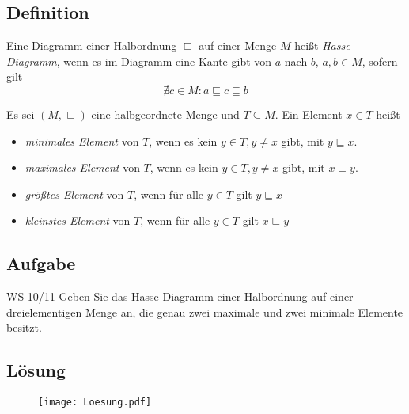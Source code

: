\subsection{Definition}
\begin{frame}
	\begin{Definition}
		Eine Diagramm einer Halbordnung $\sqsubseteq$ auf einer Menge $M$ heißt \emph{Hasse-Diagramm}, wenn es im Diagramm eine Kante gibt von $a$ nach $b$, $a,b\in M$, sofern gilt $$ \nexists c\in M : a\sqsubseteq c \sqsubseteq b $$
	\end{Definition} \pause
	
	\begin{Definition}
		Es sei $(M,\sqsubseteq)$ eine halbgeordnete Menge und $T\subseteq M$. Ein Element $x\in T$ heißt 
		\begin{itemize}
			\item \emph{minimales Element} von $T$, wenn es kein $y\in T, y\neq x$ gibt, mit $y\sqsubseteq x$.
			\item \emph{maximales Element} von $T$, wenn es kein $y\in T, y\neq x$ gibt, mit $x\sqsubseteq y$.
			\item \emph{größtes Element} von $T$, wenn für alle $y\in T$ gilt $y\sqsubseteq x$
			\item \emph{kleinstes Element} von $T$, wenn für alle $y\in T$ gilt $x\sqsubseteq y$
		\end{itemize}
	
	\end{Definition}
\end{frame}




\subsection{Aufgabe}
\begin{frame}{WS 10/11}
	Geben Sie das Hasse-Diagramm einer Halbordnung auf einer dreielementigen Menge an, die genau zwei maximale und zwei minimale Elemente besitzt.
\end{frame}
\subsection{Lösung}
\begin{frame}
	\begin{figure}[H]
		\centering
		\texttt{[image: Loesung.pdf]}
	\end{figure}
\end{frame}